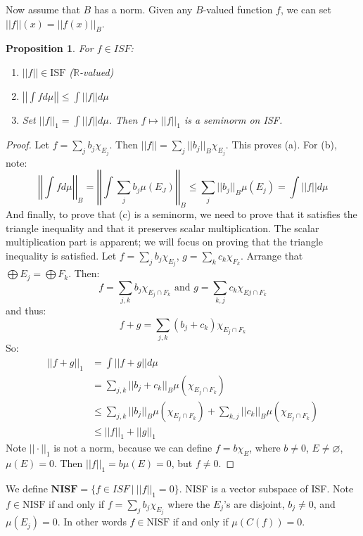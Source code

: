 \documentclass[a4paper,12pt]{report}
\newtheorem{prop}[theorem]{Proposition}
\newenvironment{definition}[1][Definition.]{\begin{trivlist}
\item[\hskip \labelsep {\bfseries #1}]}{\end{trivlist}}
\begin{document}
	\noindent Now assume that $B$ has a norm. Given any $B$-valued function $f$, we can set $||f||(x) = ||f(x)||_B$. 
	
	\begin{prop}
	For $f \in ISF$:
	\begin{enumerate}[label=(\alph*)]
		\item $||f|| \in \text{ISF}$ ($\mathbb{R}$-valued) 
		\item $\left|\left| \int f d\mu \right|\right| \leq \int ||f|| d\mu$
		\item Set $||f||_1 = \int ||f|| d\mu$. Then $f \mapsto ||f||_1$ is a seminorm on ISF. 
	\end{enumerate}
	\end{prop}
	\begin{proof}
	Let $f = \sum_j b_j \chi_{E_j}$. Then $||f|| = \sum_j ||b_j||_B \chi_{E_j}$. This proves (a). For (b), note:
	\[ \left|\left| \int f d\mu \right|\right|_B = \left|\left| \int \sum_j b_j \mu(E_J) \right|\right|_B \leq \sum_j ||b_j||_B \mu(E_j) = \int ||f|| d\mu \]
	And finally, to prove that (c) is a seminorm, we need to prove that it satisfies the triangle inequality and that it preserves scalar multiplication. The scalar multiplication part is apparent; we will focus on proving that the triangle inequality is satisfied. Let $f = \sum_j b_j \chi_{E_j}$, $g = \sum_k c_k \chi_{F_k}$. Arrange that $\bigoplus E_j = \bigoplus F_k$. Then:
	\[ f = \sum_{j, k} b_j \chi_{E_j \cap F_k} \text{ and } g = \sum_{k, j} c_k \chi_{Ej \cap F_k} \]
	and thus:
	\[ f + g = \sum_{j, k} (b_j + c_k) \chi_{E_j \cap F_k} \]
	So:
	\begin{align*}
	||f + g||_1 &= \int ||f + g|| d \mu \\
	&= \sum_{j, k} ||b_j + c_k||_B \mu(\chi_{E_j \cap F_k}) \\
	&\leq \sum_{j, k} ||b_j||_B \mu(\chi_{E_j \cap F_k}) + \sum_{k,j} ||c_k||_B \mu(\chi_{E_j \cap F_k}) \\
	&\leq ||f||_1 + ||g||_1 
	\end{align*}
	Note $||\cdot||_1$ is not a norm, because we can define $f = b \chi_E$, where $b \neq 0$, $E \neq \varnothing$, $\mu(E) = 0$. Then $||f||_1 = b \mu(E) = 0$, but $f \neq 0$. 
	\end{proof}
	
	\begin{definition}
	We define $\textbf{NISF} = \{ f \in ISF ~|~ ||f||_1 = 0 \}$. NISF is a vector subspace of ISF. Note $f \in \text{NISF}$ if and only if $f = \sum_j b_j \chi_{E_j}$ where the $E_j$'s are disjoint, $b_j \neq 0$, and $\mu(E_j) = 0$. In other words $f \in \text{NISF}$ if and only if $\mu(C(f)) = 0$.  
	\end{definition}
	
\end{document}
